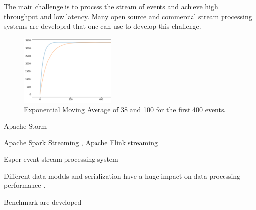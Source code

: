 The main challenge is to process the stream of events and achieve high throughput and low latency. 
Many open source and commercial stream processing systems are developed that one can use to develop this challenge. 




\begin{figure}[!ht]
    \begin{center}
        \includegraphics[width=0.42\textwidth]{./images/query2_example_200.png}
        \caption{Exponential Moving Average of 38 and 100 for the first 400 events.}
        \label{fig:EMA200}
    \end{center}
\end{figure}





Apache Storm \cite{8288619}

Apache Spark Streaming \cite{zaharia2010spark}, Apache Flink streaming \cite{alexandrov2014stratosphere}

Esper event stream processing system \cite{Bernhardt2007}


Different data models and serialization have a huge impact on data processing performance \cite{DBLP:conf/cloud/SikdarTJ17}. 

Benchmark are developed \cite{DBLP:conf/cloud/SikdarTJ17} \cite{8701904}